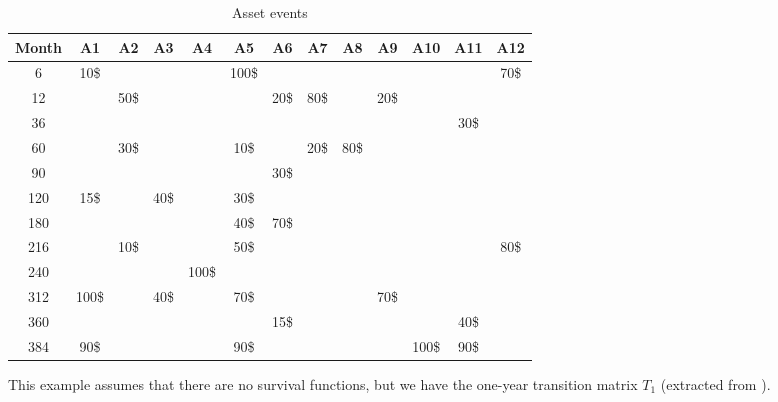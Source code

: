 \documentclass[a4paper,12pt,final]{article}
\begin{document}
{\small
\begin{table}[!h]
\begin{center}
\begin{tabular}[]{c|c|c|c|c|c|c|c|c|c|c|c|c}
Month & A1  & A2  & A3  & A4  & A5  & A6  & A7  & A8  & A9  & A10 & A11 & A12  \\
\hline
6     & 10\$&     &     &     &100\$&     &     &     &     &     &     & 70\$ \\
12    &     & 50\$&     &     &     & 20\$& 80\$&     & 20\$&     &     &      \\
36    &     &     &     &     &     &     &     &     &     &     & 30\$&      \\
60    &     & 30\$&     &     & 10\$&     & 20\$& 80\$&     &     &     &      \\
90    &     &     &     &     &     & 30\$&     &     &     &     &     &      \\
120   & 15\$&     & 40\$&     & 30\$&     &     &     &     &     &     &      \\
180   &     &     &     &     & 40\$& 70\$&     &     &     &     &     &      \\
216   &     & 10\$&     &     & 50\$&     &     &     &     &     &     & 80\$ \\
240   &     &     &     &100\$&     &     &     &     &     &     &     &      \\
312   &100\$&     & 40\$&     & 70\$&     &     &     & 70\$&     &     &      \\
360   &     &     &     &     &     & 15\$&     &     &     &     & 40\$&      \\
384   & 90\$&     &     &     & 90\$&     &     &     &     &100\$& 90\$&      \\       
\end{tabular}
\caption{Asset events}
\label{example.assets}
\end{center}
\end{table}
}

This example assumes that there are no survival functions, but we have the 
one-year transition matrix $T_1$ (extracted from \cite{CreditMetrics:Tech_Doc}).
\end{document}
